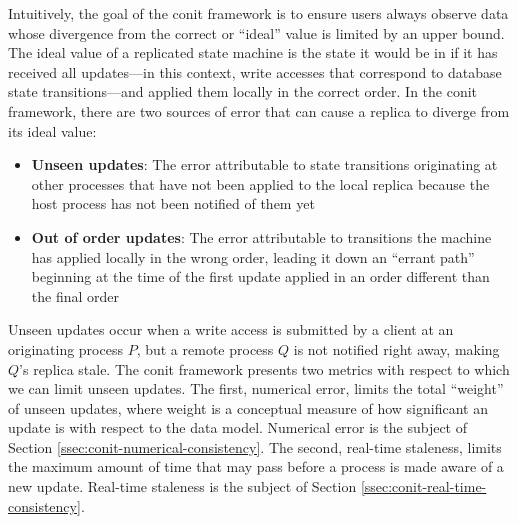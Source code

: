 \documentclass[]             %
{NASA}                       %
\theoremstyle{definition}
\begin{document}
Intuitively, the goal of the conit framework is to ensure users always
observe data whose divergence from the correct or ``ideal'' value is
limited by an upper bound. The ideal value of a replicated state
machine is the state it would be in if it has received all
updates---in this context, write accesses that correspond to database
state transitions---and applied them locally in the correct order. In
the conit framework, there are two sources of error that can cause a
replica to diverge from its ideal value:
\begin{itemize}
\item \textbf{Unseen updates}: The error attributable to state
  transitions originating at other processes that have not been
  applied to the local replica because the host process has not been
  notified of them yet
\item \textbf{Out of order updates}: The error attributable to
  transitions the machine has applied locally in the wrong order,
  leading it down an ``errant path'' beginning at the time of the
  first update applied in an order different than the final order
\end{itemize}

Unseen updates occur when a write access is submitted by a client at
an originating process $P$, but a remote process $Q$ is not notified
right away, making $Q$'s replica stale. The conit framework presents
two metrics with respect to which we can limit unseen updates. The
first, numerical error, limits the total ``weight'' of unseen updates,
where weight is a conceptual measure of how significant an update is
with respect to the data model. Numerical error is the subject of
Section \ref{ssec:conit-numerical-consistency}. The second, real-time
staleness, limits the maximum amount of time that may pass before a
process is made aware of a new update. Real-time staleness is the
subject of Section \ref{ssec:conit-real-time-consistency}.
\end{document}
